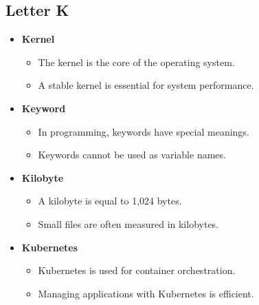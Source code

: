 \subsection{Letter K}
\begin{itemize}
    \item \textbf{Kernel}
    \begin{itemize}
        \item The kernel is the core of the operating system.
        \item A stable kernel is essential for system performance.
    \end{itemize}
    \item \textbf{Keyword}
    \begin{itemize}
        \item In programming, keywords have special meanings.
        \item Keywords cannot be used as variable names.
    \end{itemize}
    \item \textbf{Kilobyte}
    \begin{itemize}
        \item A kilobyte is equal to 1,024 bytes.
        \item Small files are often measured in kilobytes.
    \end{itemize}
    \item \textbf{Kubernetes}
    \begin{itemize}
        \item Kubernetes is used for container orchestration.
        \item Managing applications with Kubernetes is efficient.
    \end{itemize}
\end{itemize}

